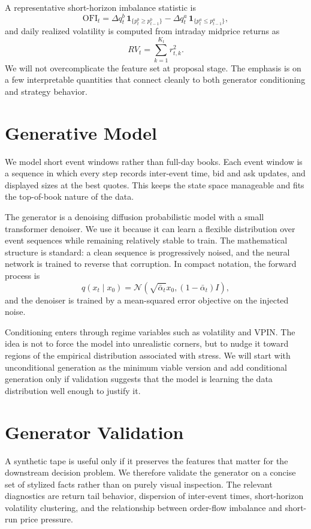 \documentclass[10pt,letterpaper,twocolumn]{article}
\newcommand{\OFI}{\mathrm{OFI}}
\begin{document}
A representative short-horizon imbalance statistic is
\[
\OFI_t = \Delta q_t^b\,\mathbf{1}_{\{p_t^b\ge p_{t-1}^b\}}
        - \Delta q_t^a\,\mathbf{1}_{\{p_t^a\le p_{t-1}^a\}},
\]
and daily realized volatility is computed from intraday midprice returns as
\[
RV_t = \sum_{k=1}^{K_t} r_{t,k}^2.
\]
We will not overcomplicate the feature set at proposal stage. The emphasis is on a few interpretable quantities that connect cleanly to both generator conditioning and strategy behavior.

\section{Generative Model}

We model short event windows rather than full-day books. Each event window is a sequence in which every step records inter-event time, bid and ask updates, and displayed sizes at the best quotes. This keeps the state space manageable and fits the top-of-book nature of the data.

The generator is a denoising diffusion probabilistic model with a small transformer denoiser. We use it because it can learn a flexible distribution over event sequences while remaining relatively stable to train. The mathematical structure is standard: a clean sequence is progressively noised, and the neural network is trained to reverse that corruption. In compact notation, the forward process is
\[
q(x_t\mid x_0)=\mathcal N\!\left(\sqrt{\bar\alpha_t}x_0,(1-\bar\alpha_t)I\right),
\]
and the denoiser is trained by a mean-squared error objective on the injected noise.

Conditioning enters through regime variables such as volatility and VPIN. The idea is not to force the model into unrealistic corners, but to nudge it toward regions of the empirical distribution associated with stress. We will start with unconditional generation as the minimum viable version and add conditional generation only if validation suggests that the model is learning the data distribution well enough to justify it.

\section{Generator Validation}

A synthetic tape is useful only if it preserves the features that matter for the downstream decision problem. We therefore validate the generator on a concise set of stylized facts rather than on purely visual inspection. The relevant diagnostics are return tail behavior, dispersion of inter-event times, short-horizon volatility clustering, and the relationship between order-flow imbalance and short-run price pressure.
\end{document}

